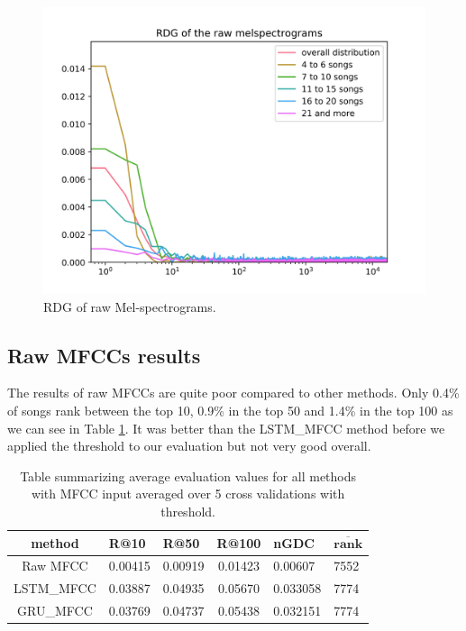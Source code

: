 \begin{figure}[H]
    \centering
	\includegraphics[width=120mm]{./img/raw_mel_graph.png}
	\caption{RDG of raw Mel-spectrograms.}
	\label{fig:raw_mel_graph}
\end{figure}

\subsection{Raw MFCCs results}\label{ssec:raw_mfccs_results}

The results of raw MFCCs are quite poor compared to other methods. Only 0.4\% of songs rank between the top 10, 0.9\% in the top 50 and 1.4\% in the top 100 as we can see in Table \ref{table:mfcc_methods}. It was better than the LSTM\_MFCC method before we applied the threshold to our evaluation but not very good overall.
\begin{table}[H]
\centering
\renewcommand{\arraystretch}{1.5}
\begin{tabu} to 1\textwidth { | c || X[c] | X[c] | c | X[c] | X[c] |}
 \hline
 \textbf{method} & \textbf{R@10} & \textbf{R@50} & \textbf{R@100} & \textbf{nGDC} & $ \boldsymbol{\overline{rank}} $ \\
 \hline
 \hline
 Raw MFCC & 0.00415 & 0.00919 & 0.01423 & 0.00607 &  7552 \\
 \hline
 LSTM\_MFCC & 0.03887 & 0.04935 & 0.05670 & 0.033058 & 7774 \\
 \hline
 GRU\_MFCC & 0.03769 & 0.04737 & 0.05438 & 0.032151 & 7774 \\
 \hline
\end{tabu} \\

\caption{Table summarizing average evaluation values for all methods with MFCC input averaged over 5 cross validations with threshold.}
\label{table:mfcc_methods}
\end{table}

